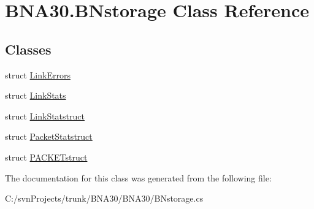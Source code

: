 \hypertarget{class_b_n_a30_1_1_b_nstorage}{}\section{B\+N\+A30.\+B\+Nstorage Class Reference}
\label{class_b_n_a30_1_1_b_nstorage}
\subsection*{Classes}
\begin{DoxyCompactItemize}
\item 
struct \mbox{\hyperlink{struct_b_n_a30_1_1_b_nstorage_1_1_link_errors}{Link\+Errors}}
\item 
struct \mbox{\hyperlink{struct_b_n_a30_1_1_b_nstorage_1_1_link_stats}{Link\+Stats}}
\item 
struct \mbox{\hyperlink{struct_b_n_a30_1_1_b_nstorage_1_1_link_statstruct}{Link\+Statstruct}}
\item 
struct \mbox{\hyperlink{struct_b_n_a30_1_1_b_nstorage_1_1_packet_statstruct}{Packet\+Statstruct}}
\item 
struct \mbox{\hyperlink{struct_b_n_a30_1_1_b_nstorage_1_1_p_a_c_k_e_tstruct}{P\+A\+C\+K\+E\+Tstruct}}
\end{DoxyCompactItemize}


The documentation for this class was generated from the following file\+:\begin{DoxyCompactItemize}
\item 
C\+:/svn\+Projects/trunk/\+B\+N\+A30/\+B\+N\+A30/B\+Nstorage.\+cs\end{DoxyCompactItemize}
